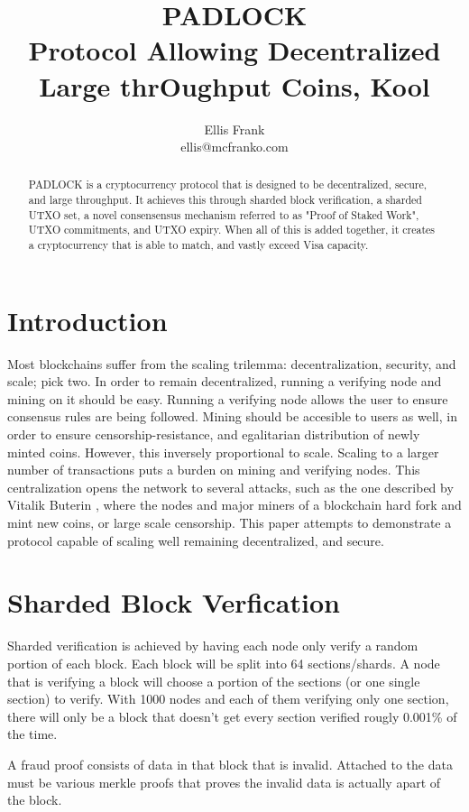 \documentclass[12pt, letterpaper]{article}
\title{
    PADLOCK \\
    \large Protocol Allowing Decentralized Large thrOughput Coins, Kool
}
\author{Ellis Frank \\ ellis@mcfranko.com}
\begin{document}
\maketitle

\begin{abstract}
    PADLOCK is a cryptocurrency protocol that is designed to be decentralized,
    secure, and large throughput. It achieves this through sharded block
    verification, a sharded UTXO set, a novel consensensus mechanism referred
    to as "Proof of Staked Work", UTXO commitments, and UTXO expiry.  When all
    of this is added together, it creates a cryptocurrency that is able to
    match, and vastly exceed Visa capacity.
\end{abstract}

\section{Introduction}
Most blockchains suffer from the scaling trilemma: decentralization, security,
and scale; pick two. In order to remain decentralized, running a verifying node
and mining on it should be easy. Running a verifying node allows the user to
ensure consensus rules are being followed. Mining should be accesible to users
as well, in order to ensure censorship-resistance, and egalitarian distribution
of newly minted coins. However, this inversely proportional to scale. Scaling to
a larger number of transactions puts a burden on mining and verifying nodes.
This centralization opens the network to several attacks, such as the one
described by Vitalik Buterin \cite{LimitToBlockchainScaling}, where the nodes
and major miners of a blockchain hard fork and mint new coins, or large scale
censorship.  This paper attempts to demonstrate a protocol capable of scaling
well remaining decentralized, and secure.

\section{Sharded Block Verfication}
Sharded verification is achieved by having each node only verify a random
portion of each block. Each block will be split into 64 sections/shards. A node
that is verifying a block will choose a portion of the sections (or one single
section) to verify. With 1000 nodes and each of them verifying only one section,
there will only be a block that doesn't get every section verified rougly
0.001\% of the time.

A fraud proof consists of data in that block that is invalid. Attached to the
data must be various merkle proofs that proves the invalid data is actually
apart of the block.
\end{document}
